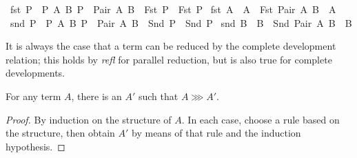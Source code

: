 \begin{implementation}
{\isacharbar}\ fst{}{\isacharcolon}\ {\isachardoublequoteopen}{\isasymlbrakk}P\ {\isachargreater}{\isachargreater}{\isachargreater}\ P{\isacharprime}{\isacharsemicolon}\ {\isacharparenleft}{\isasymAnd}A\ B{\isachardot}\ P\ {\isasymnoteq}\ Pair\ A\ B{\isacharparenright}{\isasymrbrakk}\ {\isasymLongrightarrow}\ {\isacharparenleft}Fst\ P{\isacharparenright}\ {\isachargreater}{\isachargreater}{\isachargreater}\ {\isacharparenleft}Fst\ P{\isacharprime}{\isacharparenright}{\isachardoublequoteclose}\isanewline
{\isacharbar}\ fst{}{\isacharcolon}\ {\isachardoublequoteopen}A\ {\isachargreater}{\isachargreater}{\isachargreater}\ A{\isacharprime}\ {\isasymLongrightarrow}\ {\isacharparenleft}Fst\ {\isacharparenleft}Pair\ A\ B{\isacharparenright}{\isacharparenright}\ {\isachargreater}{\isachargreater}{\isachargreater}\ A{\isacharprime}{\isachardoublequoteclose}\isanewline
{\isacharbar}\ snd{}{\isacharcolon}\ {\isachardoublequoteopen}{\isasymlbrakk}P\ {\isachargreater}{\isachargreater}{\isachargreater}\ P{\isacharprime}{\isacharsemicolon}\ {\isacharparenleft}{\isasymAnd}A\ B{\isachardot}\ P\ {\isasymnoteq}\ Pair\ A\ B{\isacharparenright}{\isasymrbrakk}\ {\isasymLongrightarrow}\ {\isacharparenleft}Snd\ P{\isacharparenright}\ {\isachargreater}{\isachargreater}{\isachargreater}\ {\isacharparenleft}Snd\ P{\isacharprime}{\isacharparenright}{\isachardoublequoteclose}\isanewline
{\isacharbar}\ snd{}{\isacharcolon}\ {\isachardoublequoteopen}B\ {\isachargreater}{\isachargreater}{\isachargreater}\ B{\isacharprime}\ {\isasymLongrightarrow}\ {\isacharparenleft}Snd\ {\isacharparenleft}Pair\ A\ B{\isacharparenright}{\isacharparenright}\ {\isachargreater}{\isachargreater}{\isachargreater}\ B{\isacharprime}{\isachardoublequoteclose}
\end{implementation}

It is always the case that a term can be reduced by the complete development relation; this holds by \emph{refl} for parallel reduction, but is also true for complete developments.

\begin{lemma}
For any term \(A\), there is an \(A'\) such that \(A \ggg A'\).
\end{lemma}
\begin{proof}
By induction on the structure of \(A\).
In each case, choose a rule based on the structure, then obtain \(A'\) by means of that rule and the induction hypothesis.
\end{proof}

